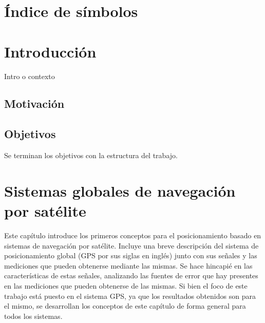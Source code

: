 \documentclass[a4paper,12pt,oneside,onecolumn,final,openright]{book}%
\begin{document}
\chapter*{Índice de símbolos}
\newpage
{}
\tableofcontents
\newpage
{}
\listoffigures


\chapter*{Introducción}
Intro o contexto
\section*{Motivación}
\section*{Objetivos}
Se terminan los objetivos con la estructura del trabajo.
\chapter{Sistemas globales de navegación por satélite}\label{ch:GNSS}
	Este capítulo introduce los primeros conceptos para el posicionamiento basado en sistemas de navegación por satélite. Incluye una breve descripción del sistema de posicionamiento global (GPS por sus siglas en inglés) junto con sus señales y las mediciones que pueden obtenerse mediante las mismas. Se hace hincapié en las características de estas señales, analizando las fuentes de error que hay presentes en las mediciones que pueden obtenerse de las mismas. Si bien el foco de este trabajo está puesto en el sistema GPS, ya que los resultados obtenidos son para el mismo, se desarrollan los conceptos de este capítulo de forma general para todos los sistemas. 
	
\end{document}
